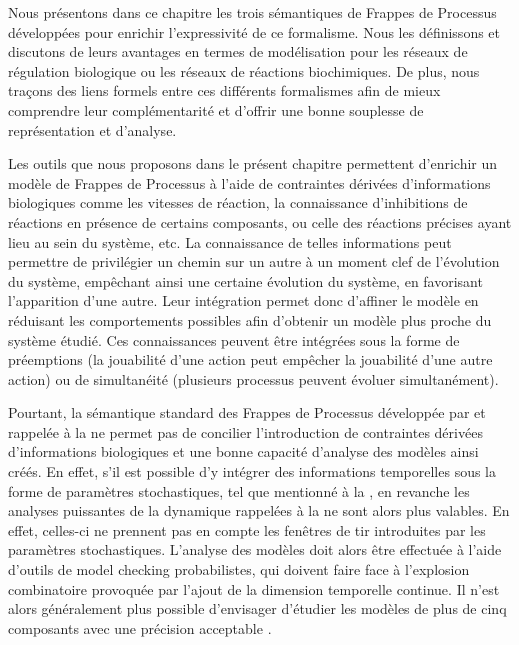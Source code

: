 Nous présentons dans ce chapitre les trois sémantiques de Frappes de Processus développées
pour enrichir l'expressivité de ce formalisme.
Nous les définissons et discutons de leurs avantages en termes de modélisation
pour les réseaux de régulation biologique ou les réseaux de réactions biochimiques.
De plus, nous traçons des liens formels entre ces différents formalismes
afin de mieux comprendre leur complémentarité
et d'offrir une bonne souplesse de représentation et d'analyse.

\myskip

Les outils que nous proposons dans le présent chapitre permettent
d'enrichir un modèle de Frappes de Processus à l'aide de
contraintes dérivées d'informations biologiques
comme les vitesses de réaction,
la connaissance d'inhibitions de réactions en présence de certains composants,
ou celle des réactions précises ayant lieu au sein du système, etc.
La connaissance de telles informations peut permettre de privilégier un chemin
sur un autre
à un moment clef de l'évolution du système, empêchant ainsi une certaine évolution du système,
en favorisant l'apparition d'une autre.
Leur intégration permet donc d'affiner le modèle en réduisant les comportements possibles
afin d'obtenir un modèle plus proche du système étudié.
Ces connaissances peuvent être intégrées sous la forme de préemptions (la jouabilité d'une action
peut empêcher la jouabilité d'une autre action) ou de simultanéité
(plusieurs processus peuvent évoluer simultanément).

Pourtant, la sémantique standard des Frappes de Processus
développée par 
et rappelée à la 
ne permet pas de concilier l'introduction de contraintes dérivées d'informations biologiques
et une bonne capacité d'analyse des modèles ainsi créés.
En effet, s'il est possible d'y intégrer des informations temporelles
sous la forme de paramètres stochastiques, tel que mentionné à la ,
en revanche les analyses puissantes de la dynamique rappelées à la 
ne sont alors plus valables.
En effet, celles-ci ne prennent pas en compte les fenêtres de tir introduites par les
paramètres stochastiques.
L'analyse des modèles doit alors être effectuée à l'aide d'outils de model checking
probabilistes, qui doivent faire face à l'explosion combinatoire provoquée par l'ajout
de la dimension temporelle continue.
Il n'est alors généralement plus possible d'envisager d'étudier
les modèles de plus de cinq composants avec une précision acceptable
\cite[p.~170]{Pauleve11}.

